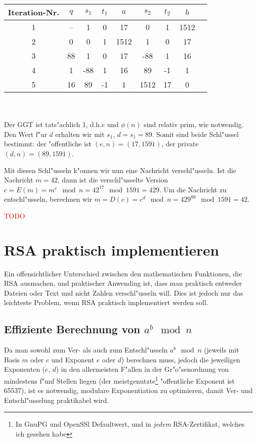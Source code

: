 \documentclass[12pt]{article}
\newcommand{\todo}[1]{\textcolor{red}{\mbox{TODO}}\marginpar{\textcolor{red}{#1}}}
\begin{document}
\begin{tabular}{c|c c c c c c c l}
    Iteration-Nr. & $q$ & $s_1$ & $t_1$ & $a$ & $s_2$ & $t_2$ & $b$ \\
    \hline
    1 & -- & 1 & 0 & 17 & 0 & 1 & 1512 \\
    2 & 0 & 0 & 1 & 1512 & 1 & 0 & 17 \\
    3 & 88 & 1 & 0 & 17 & -88 & 1 & 16 \\
    4 & 1 & -88 & 1 & 16 & 89 & -1 & 1 \\
    5 & 16 & 89 & -1 & 1 & 1512 & 17 & 0 \\
\end{tabular}
~\\~\\
\noindent
Der GGT ist tats"achlich 1, d.h.\@ $e$ und $\phi(n)$ sind relativ prim, wie notwendig.
Den Wert f"ur $d$ erhalten wir mit $s_1$, $d = s_1 = 89$.
Somit sind beide Schl"ussel bestimmt: der "offentliche ist $(e, n) = (17, 1591)$, der private $(d, n) = (89, 1591)$.

Mit diesen Schl"usseln k"onnen wir nun eine Nachricht verschl"usseln.
Ist die Nachricht $m = 42$, dann ist die verschl"usselte Version $c = E(m) = m^e \mod n = 42^{17} \mod 1591 = 429$.
Um die Nachricht zu entschl"usseln, berechnen wir $m = D(c) = c^d \mod n = 429^{89} \mod 1591 = 42$.

\todo{Angriff?}

\section{RSA praktisch implementieren}

Ein offensichtlicher Unterschied zwischen den mathematischen Funktionen,
die RSA ausmachen, und praktischer Anwending ist, dass man praktisch entweder Dateien
oder Text und nicht Zahlen verschl"usseln will.
Dies ist jedoch nur das leichteste Problem, wenn RSA praktisch implementiert werden soll.

\subsection{Effiziente Berechnung von $a^b \mod n$}

Da man sowohl zum Ver- als auch zum Entschl"usseln $a^b \mod n$
(jeweils mit Basis $m$ oder $c$ und Exponent $e$ oder $d$) berechnen muss,
jedoch die jeweiligen Exponenten ($e$, $d$) in den allermeisten F"allen
in der Gr"o"senordnung von mindestens f"unf Stellen liegen
(der meistgenutzte\footnote{In GnuPG und OpenSSl Defaultwert,
und in \emph{jedem} RSA-Zertifikat, welches ich gesehen habe}
"offentliche Exponent ist 65537),
ist es notwendig, modulare Exponentiation zu optimieren,
damit Ver- und Entschl"usselung praktikabel wird.
\end{document}
